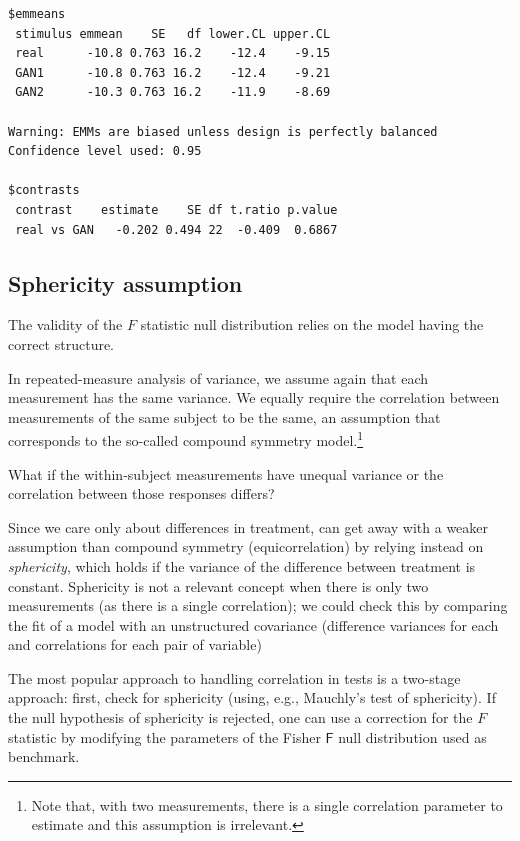 \documentclass[
  11pt,
  letterpaper,
]{scrbook}
\theoremstyle{definition}
\theoremstyle{remark}
\begin{document}
\begin{verbatim}
$emmeans
 stimulus emmean    SE   df lower.CL upper.CL
 real      -10.8 0.763 16.2    -12.4    -9.15
 GAN1      -10.8 0.763 16.2    -12.4    -9.21
 GAN2      -10.3 0.763 16.2    -11.9    -8.69

Warning: EMMs are biased unless design is perfectly balanced 
Confidence level used: 0.95 

$contrasts
 contrast    estimate    SE df t.ratio p.value
 real vs GAN   -0.202 0.494 22  -0.409  0.6867
\end{verbatim}

\hypertarget{sphericity-assumption}{%
\subsection{Sphericity assumption}\label{sphericity-assumption}}

The validity of the \(F\) statistic null distribution relies on the
model having the correct structure.

In repeated-measure analysis of variance, we assume again that each
measurement has the same variance. We equally require the correlation
between measurements of the same subject to be the same, an assumption
that corresponds to the so-called compound symmetry model.\footnote{Note
  that, with two measurements, there is a single correlation parameter
  to estimate and this assumption is irrelevant.}

What if the within-subject measurements have unequal variance or the
correlation between those responses differs?

Since we care only about differences in treatment, can get away with a
weaker assumption than compound symmetry (equicorrelation) by relying
instead on \emph{sphericity}, which holds if the variance of the
difference between treatment is constant. Sphericity is not a relevant
concept when there is only two measurements (as there is a single
correlation); we could check this by comparing the fit of a model with
an unstructured covariance (difference variances for each and
correlations for each pair of variable)

The most popular approach to handling correlation in tests is a
two-stage approach: first, check for sphericity (using, e.g., Mauchly's
test of sphericity). If the null hypothesis of sphericity is rejected,
one can use a correction for the \(F\) statistic by modifying the
parameters of the Fisher \(\mathsf{F}\) null distribution used as
benchmark.
\end{document}
